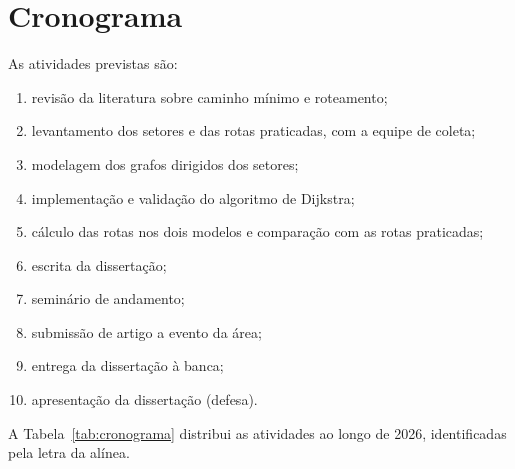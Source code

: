 \documentclass[diss-proposta]{texufpel}
\begin{document}
\chapter{Cronograma}

As atividades previstas são:

\begin{enumerate}
  \item revisão da literatura sobre caminho mínimo e roteamento;
  \item levantamento dos setores e das rotas praticadas, com a equipe de
        coleta;
  \item modelagem dos grafos dirigidos dos setores;
  \item implementação e validação do algoritmo de Dijkstra;
  \item cálculo das rotas nos dois modelos e comparação com as rotas
        praticadas;
  \item escrita da dissertação;
  \item seminário de andamento;
  \item submissão de artigo a evento da área;
  \item entrega da dissertação à banca;
  \item apresentação da dissertação (defesa).
\end{enumerate}

A Tabela~\ref{tab:cronograma} distribui as atividades ao longo de 2026,
identificadas pela letra da alínea.
\end{document}
